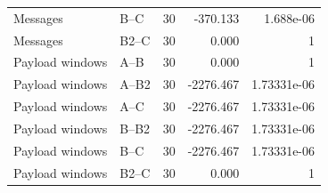 \begin{table}[t]
\begin{tabular}{llrrr}
Messages & B--C & 30 & -370.133 & 1.688e-06 \\
Messages & B2--C & 30 & 0.000 & 1 \\
Payload windows & A--B & 30 & 0.000 & 1 \\
Payload windows & A--B2 & 30 & -2276.467 & 1.73331e-06 \\
Payload windows & A--C & 30 & -2276.467 & 1.73331e-06 \\
Payload windows & B--B2 & 30 & -2276.467 & 1.73331e-06 \\
Payload windows & B--C & 30 & -2276.467 & 1.73331e-06 \\
Payload windows & B2--C & 30 & 0.000 & 1 \\
\bottomrule
\end{tabular}
\end{table}

